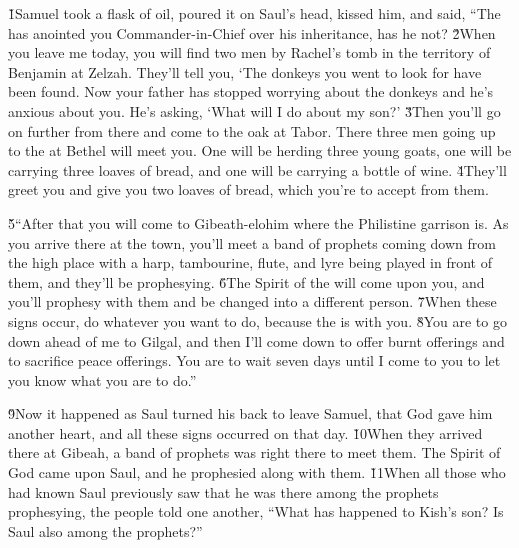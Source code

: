 \v{1}Samuel took a flask of oil, poured it on Saul's head, kissed him, and said, ``The  has anointed you Commander-in-Chief over his inheritance, has he not? \v{2}When you leave me today, you will find two men by Rachel's tomb in the territory of Benjamin at Zelzah. They'll tell you, `The donkeys you went to look for have been found. Now your father has stopped worrying about the donkeys and he's anxious about you. He's asking, `What will I do about my son?' \v{3}Then you'll go on further from there and come to the oak at Tabor. There three men going up to the  at Bethel will meet you. One will be herding three young goats, one will be carrying three loaves of bread, and one will be carrying a bottle of wine. \v{4}They'll greet you and give you two loaves of bread, which you're to accept from them.

\v{5}``After that you will come to Gibeath-elohim where the Philistine garrison is. As you arrive there at the town, you'll meet a band of prophets coming down from the high place with a harp, tambourine, flute, and lyre being played in front of them, and they'll be prophesying. \v{6}The Spirit of the  will come upon you, and you'll prophesy with them and be changed into a different person. \v{7}When these signs occur, do whatever you want to do, because the  is with you. \v{8}You are to go down ahead of me to Gilgal, and then I'll come down to offer burnt offerings and to sacrifice peace offerings. You are to wait seven days until I come to you to let you know what you are to do.''

\v{9}Now it happened as Saul turned his back to leave Samuel, that God gave him another heart, and all these signs occurred on that day. \v{10}When they arrived there at Gibeah, a band of prophets was right there to meet them. The Spirit of God came upon Saul, and he prophesied along with them. \v{11}When all those who had known Saul previously saw that he was there among the prophets prophesying, the people told one another, ``What has happened to Kish's son? Is Saul also among the prophets?''


